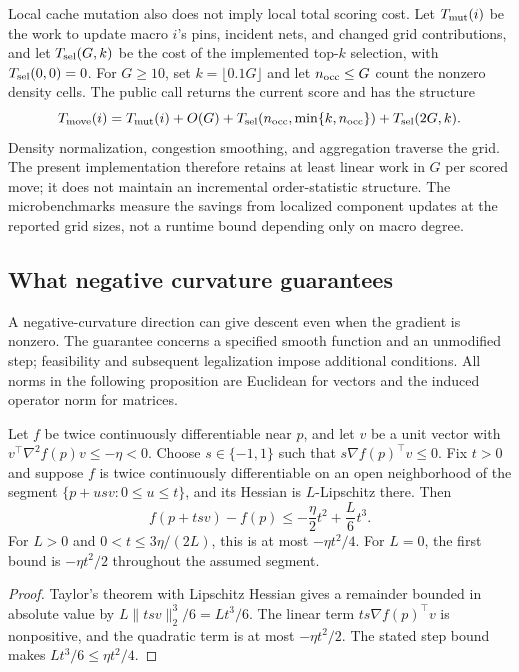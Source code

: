 Local cache mutation also does not imply local total scoring cost. Let
$T_{\rm mut}(i)$ be the work to update macro $i$'s pins, incident nets, and
changed grid contributions, and let $T_{\rm sel}(G,k)$ be the cost of the
implemented top-$k$ selection, with $T_{\rm sel}(0,0)=0$. For $G\ge10$, set
$k=\lfloor0.1G\rfloor$ and let $n_{\rm occ}\le G$ count the nonzero density
cells. The public  call returns the current score and has the structure
\begin{equation}
 T_{\rm move}(i)=T_{\rm mut}(i)+O(G)
 +T_{\rm sel}(n_{\rm occ},\min\{k,n_{\rm occ}\})
 +T_{\rm sel}(2G,k).
 \label{eq:move-cost}
\end{equation}
Density normalization, congestion smoothing, and aggregation traverse the grid.
The present implementation therefore retains at least linear work in $G$ per
scored move; it does not maintain an incremental order-statistic structure.
The microbenchmarks measure the savings from localized component updates at the
reported grid sizes, not a runtime bound depending only on macro degree.

\subsection{What negative curvature guarantees}\label{sec:curvature}

A negative-curvature direction can give descent even when the gradient is
nonzero. The guarantee concerns a specified smooth function and an unmodified
step; feasibility and subsequent legalization impose additional conditions.
All norms in the following proposition are Euclidean for vectors and the
induced operator norm for matrices.

\begin{proposition}\label{prop:curvature}
Let $f$ be twice continuously differentiable near $p$, and let $v$ be a unit
vector with $v^\top\nabla^2 f(p)v\le-\eta<0$. Choose
$s\in\{-1,1\}$ such that $s\nabla f(p)^\top v\le0$. Fix $t>0$ and suppose $f$ is twice
continuously differentiable on an open neighborhood of the segment
$\{p+usv:0\le u\le t\}$, and its Hessian is $L$-Lipschitz there. Then
\begin{equation}
 f(p+tsv)-f(p)\le-\frac{\eta}{2}t^2+\frac{L}{6}t^3.
 \label{eq:curvature-taylor}
\end{equation}
For $L>0$ and $0<t\le3\eta/(2L)$, this is at most $-\eta t^2/4$.
For $L=0$, the first bound is $-\eta t^2/2$ throughout the assumed segment.
\end{proposition}
\begin{proof}
Taylor's theorem with Lipschitz Hessian gives a remainder bounded in absolute
value by $L\|tsv\|_2^3/6=Lt^3/6$. The linear term
$ts\nabla f(p)^\top v$ is nonpositive, and the quadratic term is at most
$-\eta t^2/2$. The stated step bound makes $Lt^3/6\le\eta t^2/4$.
\end{proof}

